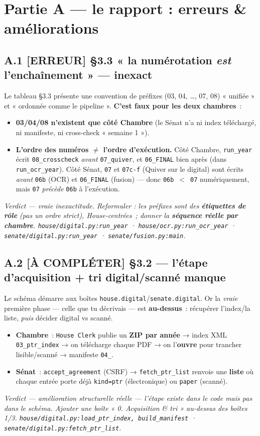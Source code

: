 \documentclass[11pt,a4paper]{article}
\newcommand{\co}[1]{\texttt{\small #1}}
\newcommand{\tagErr}{\textcolor{red!75!black}{\textbf{[ERREUR]}}}
\newcommand{\tagAmel}{\textcolor{orange!90!black}{\textbf{[À COMPLÉTER]}}}
\newcommand{\verdict}[1]{\par\smallskip\noindent{\color{coreC}\rule{2pt}{\baselineskip}}\hspace{6pt}\textit{Verdict — #1}\par\smallskip}
\begin{document}
\section{Partie A — le rapport : erreurs \& améliorations}

\subsection{A.1 \;\tagErr{} \;§3.3 « la numérotation \emph{est} l'enchaînement » — inexact}
Le tableau §3.3 présente une convention de préfixes (03, 04, …, 07, 08) « unifiée » et « ordonnée comme
le pipeline ». \textbf{C'est faux pour les deux chambres}~:
\begin{itemize}[nosep,leftmargin=1.4em]
\item \textbf{03/04/08 n'existent que côté Chambre} (le Sénat n'a ni index téléchargé, ni manifeste, ni
cross-check « semaine 1 »).
\item \textbf{L'ordre des numéros $\neq$ l'ordre d'exécution.} Côté Chambre, \co{run_year} écrit
\co{08_crosscheck} \emph{avant} \co{07_quiver}, et \co{06_FINAL} bien après (dans \co{run_ocr_year}).
Côté Sénat, \co{07} et \co{07c-f} (Quiver sur le digital) sont écrits \emph{avant} \co{06b} (OCR) et
\co{06_FINAL} (fusion) — donc \co{06b}~$<$~\co{07} numériquement, mais \co{07} \emph{précède} \co{06b}
à l'exécution.
\end{itemize}
\verdict{vraie inexactitude. Reformuler : les préfixes sont des \textbf{étiquettes de rôle} (pas un
ordre strict), House-centrées~; donner la \textbf{séquence réelle par chambre}.
\co{house/digital.py:run_year} · \co{house/ocr.py:run_ocr_year} · \co{senate/digital.py:run_year} ·
\co{senate/fusion.py:main}.}

\subsection{A.2 \;\tagAmel{} \;§3.2 — l'étape d'\textbf{acquisition + tri digital/scanné} manque}
Le schéma démarre aux boîtes \co{house.digital}/\co{senate.digital}. Or la \emph{vraie} première phase
— celle que tu décrivais — est \textbf{au-dessus}~: récupérer l'index/la liste, \emph{puis} décider
digital vs scanné.
\begin{itemize}[nosep,leftmargin=1.4em]
\item \textbf{Chambre}~: \co{House Clerk} publie un \textbf{ZIP par année} → index XML \co{03_ptr_index}
→ on télécharge chaque PDF → on l'\textbf{ouvre} pour trancher lisible/scanné → manifeste \co{04_}.
\item \textbf{Sénat}~: \co{accept_agreement} (CSRF) → \co{fetch_ptr_list} renvoie une \textbf{liste} où
chaque entrée porte déjà \co{kind=ptr} (électronique) ou \co{paper} (scanné).
\end{itemize}
\verdict{amélioration structurelle réelle — l'étape \emph{existe} dans le code mais \emph{pas} dans le
schéma. Ajouter une boîte « 0. Acquisition \& tri » au-dessus des boîtes 1/3.
\co{house/digital.py:load_ptr_index, build_manifest} · \co{senate/digital.py:fetch_ptr_list}.}
\end{document}
